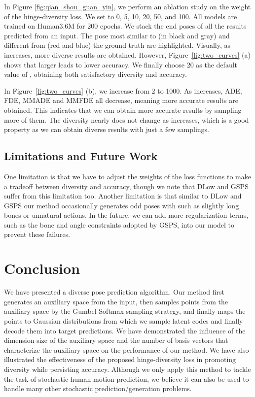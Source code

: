 \documentclass[sigconf,screen,nonacm]{acmart}
\begin{document}
	In Figure \ref{fig:qian_shou_guan_yin}, we perform an ablation study on the weight of the hinge-diversity loss. We set  to 0, 5, 10, 20, 50, and 100. All models are trained on Human3.6M for 200 epochs. We stack the end poses of all the results predicted from an input. The pose most similar to (in black and gray) and different from (red and blue) the ground truth are highlighted. Visually, as  increases, more diverse results are obtained. However, Figure~\ref{fig:two_curves} (a) shows that larger  leads to lower accuracy. We finally choose 20 as the default value of , obtaining both satisfactory diversity and accuracy.
	
	In Figure~\ref{fig:two_curves} (b), we increase  from 2 to 1000. As  increases, ADE, FDE, MMADE and MMFDE all decrease, meaning more accurate results are obtained. This indicates that we can obtain more accurate results by sampling more of them. The diversity nearly does not change as  increases, which is a good property as we can obtain diverse results with just a few samplings.
	


	\subsection{Limitations and Future Work}
	One limitation is that we have to adjust the weights of the loss functions to make a tradeoff between diversity and accuracy, though we note that DLow and GSPS suffer from this limitation too. Another limitation is that similar to DLow and GSPS our method occasionally generates odd poses with such as slightly long bones or unnatural actions. In the future, we can add more regularization terms, such as the bone and angle constraints adopted by GSPS, into our model to prevent these failures.
	
	\section{Conclusion}
	We have presented a diverse pose prediction algorithm. Our method first generates an auxiliary space from the input, then samples points from the auxiliary space by the Gumbel-Softmax sampling strategy, and finally maps the points to Gaussian distributions from which we sample latent codes and finally decode them into target predictions. We have demonstrated the influence of the dimension size of the auxiliary space and the number of basis vectors that characterize the auxiliary space on the performance of our method. We have also illustrated the effectiveness of the proposed hinge-diversity loss in promoting diversity while persisting accuracy. Although we only apply this method to tackle the task of stochastic human motion prediction, we believe it can also be used to handle many other stochastic prediction/generation problems.
	
\end{document}
